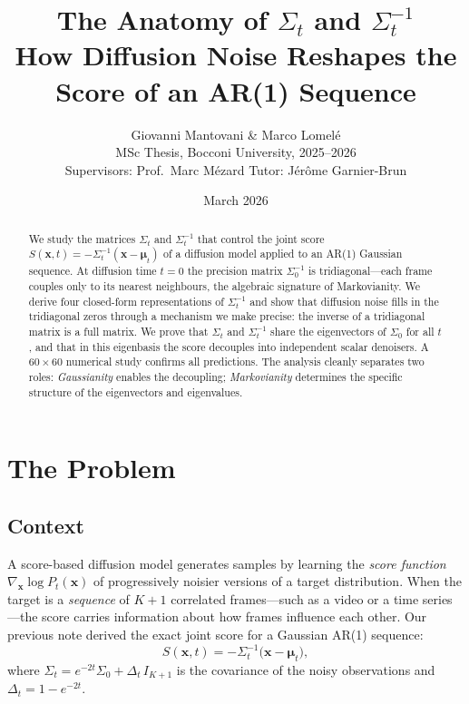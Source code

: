 \documentclass[11pt,a4paper]{article}
\title{\bfseries The Anatomy of $\Sigma_t$ and $\Sigma_t^{-1}$\\[4pt]
\large How Diffusion Noise Reshapes the Score of an AR(1) Sequence}
\author{Giovanni Mantovani \& Marco Lomel\'e\\[2pt]
\small MSc Thesis, Bocconi University, 2025--2026\\
\small Supervisors: Prof.\ Marc M\'ezard \quad Tutor: J\'er\^ome Garnier-Brun}
\date{March 2026}
\theoremstyle{definition}
\newcommand{\Dt}{\Delta_t}
\begin{document}
\maketitle

\begin{abstract}
We study the matrices $\Sigma_t$ and $\Sigma_t^{-1}$ that control the joint score $S(\mathbf{x},t) = -\Sigma_t^{-1}(\mathbf{x}-\bm{\mu}_t)$ of a diffusion model applied to an AR(1) Gaussian sequence.
At diffusion time $t=0$ the precision matrix $\Sigma_0^{-1}$ is tridiagonal---each frame couples only to its nearest neighbours, the algebraic signature of Markovianity.
We derive four closed-form representations of $\Sigma_t^{-1}$ and show that diffusion noise fills in the tridiagonal zeros through a mechanism we make precise: the inverse of a tridiagonal matrix is a full matrix.
We prove that $\Sigma_t$ and $\Sigma_t^{-1}$ share the eigenvectors of $\Sigma_0$ for all $t$, and that in this eigenbasis the score decouples into independent scalar denoisers.
A $60 \times 60$ numerical study confirms all predictions.
The analysis cleanly separates two roles: \emph{Gaussianity} enables the decoupling; \emph{Markovianity} determines the specific structure of the eigenvectors and eigenvalues.
\end{abstract}

\tableofcontents

\section{The Problem}

\subsection{Context}

A score-based diffusion model generates samples by learning the \emph{score function} $\nabla_{\mathbf{x}}\log P_t(\mathbf{x})$ of progressively noisier versions of a target distribution.
When the target is a \emph{sequence} of $K+1$ correlated frames---such as a video or a time series---the score carries information about how frames influence each other.
Our previous note derived the exact joint score for a Gaussian AR(1) sequence:
\begin{equation}\label{eq:score}
  S(\mathbf{x},t) = -\Sigma_t^{-1}\bigl(\mathbf{x}-\bm{\mu}_t\bigr),
\end{equation}
where $\Sigma_t = e^{-2t}\Sigma_0 + \Dt\, I_{K+1}$ is the covariance of the noisy observations and $\Dt = 1 - e^{-2t}$.
\end{document}
